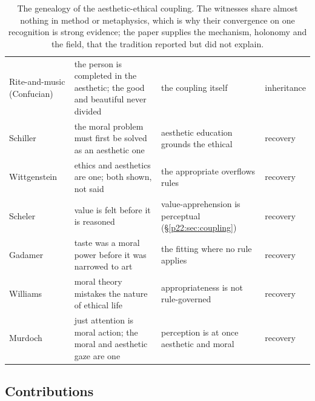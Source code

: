 \begin{table}[ht]
\centering
\small
\begin{tabularx}{\textwidth}{@{}L{2.3cm} L{4.6cm} L{2.0cm} L{1.5cm}@{}}
\toprule
{} &  &  &  \\
\midrule
Rite-and-music (Confucian) & the person is completed in the aesthetic; the good and beautiful never divided & the coupling itself & inheritance \\
Schiller & the moral problem must first be solved as an aesthetic one & aesthetic education grounds the ethical & recovery \\
Wittgenstein & ethics and aesthetics are one; both shown, not said & the appropriate overflows rules & recovery \\
Scheler & value is felt before it is reasoned & value-apprehension is perceptual (\S\ref{p22:sec:coupling}) & recovery \\
Gadamer & taste was a moral power before it was narrowed to art & the fitting where no rule applies & recovery \\
Williams & moral theory mistakes the nature of ethical life & appropriateness is not rule-governed & recovery \\
Murdoch & just attention is moral action; the moral and aesthetic gaze are one & perception is at once aesthetic and moral & recovery \\
\bottomrule
\end{tabularx}
\caption{The genealogy of the aesthetic-ethical coupling. The witnesses share almost nothing in method or metaphysics, which is why their convergence on one recognition is strong evidence; the paper supplies the mechanism, holonomy and the field, that the tradition reported but did not explain.}
\label{p22:tab:genealogy}
\end{table}

\subsection{Contributions}
\label{p22:sub:contrib-list}

